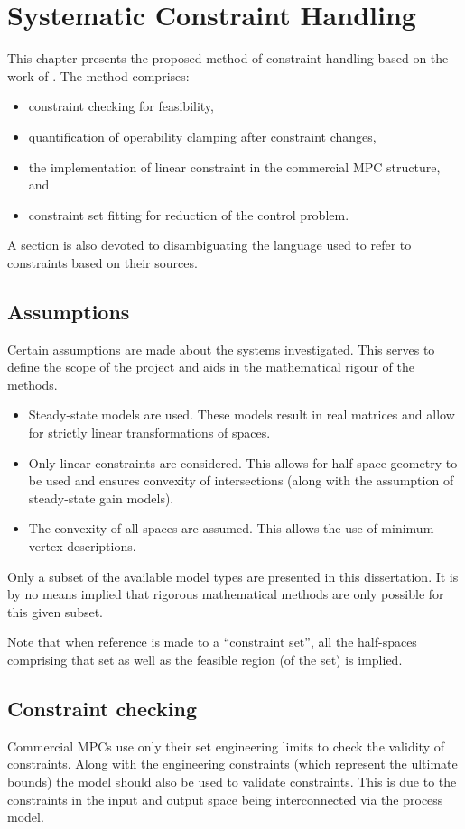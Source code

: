 \chapter{Systematic Constraint Handling}\label{chap:conhand}
\begin{overview}
  This chapter presents the proposed method of constraint handling based on the work of \citet{vinsonphd}.
  The method comprises:
  \begin{itemize}
    \item constraint checking for feasibility,
    \item quantification of operability clamping after constraint changes,
    \item the implementation of linear constraint in the commercial MPC structure, and
    \item constraint set fitting for reduction of the control problem.
  \end{itemize}
  A section is also devoted to disambiguating the language used to refer to constraints based on their sources.
\end{overview}

\section{Assumptions}
Certain assumptions are made about the systems investigated.
This serves to define the scope of the project and aids in the mathematical rigour of the methods.
\begin{itemize}
\item Steady-state models are used.
  These models result in real matrices and allow for strictly linear transformations of spaces.
\item Only linear constraints are considered.
  This allows for half-space geometry to be used and ensures convexity of intersections (along with the assumption of steady-state gain models).
\item The convexity of all spaces are assumed.
  This allows the use of minimum vertex descriptions.
\end{itemize}
Only a subset of the available model types are presented in this dissertation.
It is by no means implied that rigorous mathematical methods are only possible for this given subset.

Note that when reference is made to a ``constraint set'', all the half-spaces comprising that set as well as the feasible region (of the set) is implied.

\section{Constraint checking}
Commercial MPCs use only their set engineering limits to check the validity of constraints.
Along with the engineering constraints (which represent the ultimate bounds) the model should also be used to validate constraints. 
This is due to the constraints in the input and output space being interconnected via the process model.


